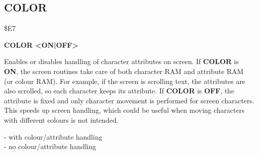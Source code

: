 
\newpage
\subsection{COLOR}
\begin{description}[leftmargin=2cm,style=nextline]
\item [Token:] \$E7
\item [Format:] {\bf COLOR <ON|OFF>}
\item [Usage:] Enables or disables
               handling of character attributes on screen.
               If {\bf COLOR} is {\bf ON}, the screen routines
               take care of both character RAM and attribute RAM (or colour RAM).
               For example, if the screen is scrolling text, the attributes
               are also scrolled, so each character keeps its attribute.
               If {\bf COLOR} is {\bf OFF}, the attribute
               is fixed and only character movement is performed
               for screen characters. This speeds up screen
               handling, which could be useful when moving characters with different colours is
               not intended.
\item [Example:]  - with colour/attribute handling \\
                  - no colour/attribute handling

\end{description}


\newpage
